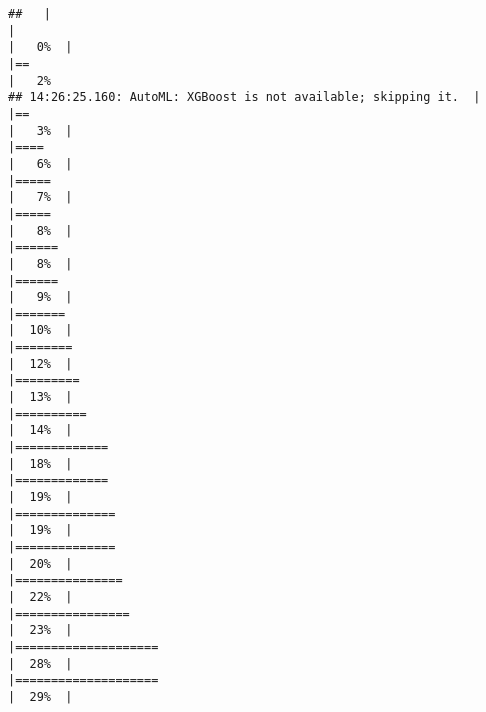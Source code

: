 \documentclass[
]{article}
\begin{document}
\begin{verbatim}
##   |                                                                              |                                                                      |   0%  |                                                                              |==                                                                    |   2%
## 14:26:25.160: AutoML: XGBoost is not available; skipping it.  |                                                                              |==                                                                    |   3%  |                                                                              |====                                                                  |   6%  |                                                                              |=====                                                                 |   7%  |                                                                              |=====                                                                 |   8%  |                                                                              |======                                                                |   8%  |                                                                              |======                                                                |   9%  |                                                                              |=======                                                               |  10%  |                                                                              |========                                                              |  12%  |                                                                              |=========                                                             |  13%  |                                                                              |==========                                                            |  14%  |                                                                              |=============                                                         |  18%  |                                                                              |=============                                                         |  19%  |                                                                              |==============                                                        |  19%  |                                                                              |==============                                                        |  20%  |                                                                              |===============                                                       |  22%  |                                                                              |================                                                      |  23%  |                                                                              |====================                                                  |  28%  |                                                                              |====================                                                  |  29%  |                         
\end{verbatim}
\end{document}
